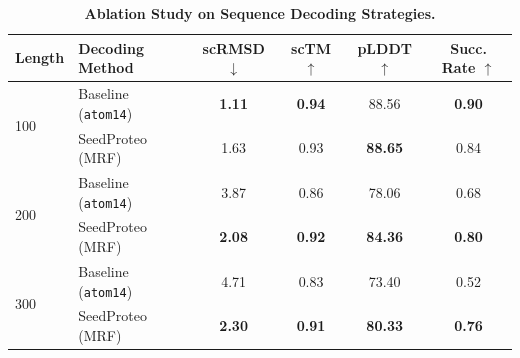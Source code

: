 \begin{table}[t]
\centering
\caption{\textbf{Ablation Study on Sequence Decoding Strategies.}}
\label{tab:ablation_mrf}
\begin{tabular}{l l cccc}
\toprule
\textbf{Length} & \textbf{Decoding Method} & \textbf{scRMSD} $\downarrow$ & \textbf{scTM} $\uparrow$ & \textbf{pLDDT} $\uparrow$ & \textbf{Succ. Rate} $\uparrow$  \\
\midrule
\multirow{2}{*}{100} 
& Baseline (\texttt{atom14}) & \textbf{1.11} & \textbf{0.94} & 88.56 & \textbf{0.90} \\
& SeedProteo (MRF)  & 1.63 & 0.93 & \textbf{88.65} & 0.84 \\
\midrule
\multirow{2}{*}{200} 
& Baseline (\texttt{atom14}) & 3.87 & 0.86 & 78.06 & 0.68 \\
& SeedProteo (MRF)  & \textbf{2.08} & \textbf{0.92} & \textbf{84.36} & \textbf{0.80} \\
\midrule
\multirow{2}{*}{300} 
& Baseline (\texttt{atom14}) & 4.71 & 0.83 & 73.40 & 0.52 \\
& SeedProteo (MRF)  & \textbf{2.30} & \textbf{0.91} & \textbf{80.33} & \textbf{0.76} \\
\bottomrule
\end{tabular}%
\end{table}